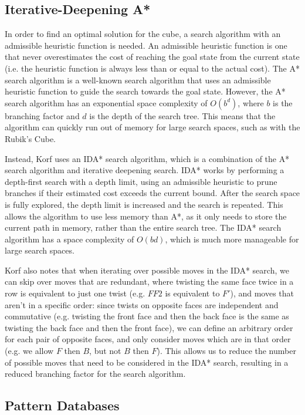 \subsection{Iterative-Deepening A*}
In order to find an optimal solution for the cube, a search algorithm with an admissible heuristic function is needed. An admissible heuristic function is one that never overestimates the cost of reaching the goal state from the current state (i.e. the heuristic function is always less than or equal to the actual cost). The A* search algorithm is a well-known search algorithm that uses an admissible heuristic function to guide the search towards the goal state. However, the A* search algorithm has an exponential space complexity of $O(b^d)$, where $b$ is the branching factor and $d$ is the depth of the search tree. This means that the algorithm can quickly run out of memory for large search spaces, such as with the Rubik's Cube.

Instead, Korf uses an IDA* search algorithm, which is a combination of the A* search algorithm and iterative deepening search. IDA* works by performing a depth-first search with a depth limit, using an admissible heuristic to prune branches if their estimated cost exceeds the current bound. After the search space is fully explored, the depth limit is increased and the search is repeated. This allows the algorithm to use less memory than A*, as it only needs to store the current path in memory, rather than the entire search tree. The IDA* search algorithm has a space complexity of $O(bd)$, which is much more manageable for large search spaces.

Korf also notes that when iterating over possible moves in the IDA* search, we can skip over moves that are redundant, where twisting the same face twice in a row is equivalent to just one twist (e.g. $F F2$ is equivalent to $F'$), and moves that aren't in a specific order: since twists on opposite faces are independent and commutative (e.g. twisting the front face and then the back face is the same as twisting the back face and then the front face), we can define an arbitrary order for each pair of opposite faces, and only consider moves which are in that order (e.g. we allow $F$ then $B$, but not $B$ then $F$). This allows us to reduce the number of possible moves that need to be considered in the IDA* search, resulting in a reduced branching factor for the search algorithm.

\subsection{Pattern Databases}

